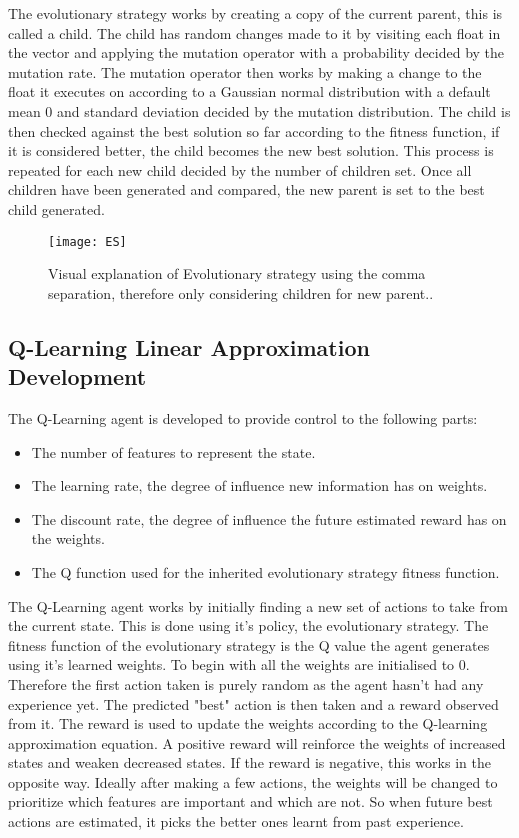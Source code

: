 \documentclass{report}
\begin{document}
The evolutionary strategy works by creating a copy of the current parent, this is called a child. The child has random changes made to it by visiting
each float in the vector and applying the mutation operator with a probability decided by the mutation rate. The mutation operator then works by making a change to the float
it executes on according to a Gaussian normal distribution \citep{gauss1809theoria} with a default mean 0 and standard deviation decided by the mutation distribution.
The child is then checked against the best solution so far according to the fitness function, if it is considered better, the child becomes the new best solution. This process is repeated
for each new child decided by the number of children set. Once all children have been generated and compared, the new parent is set to the best child generated.

\begin{figure}
\centerline{\texttt{[image: ES]}}
\caption[Evolutionary Strategy]{}
\centerline{Visual explanation of Evolutionary strategy using the comma separation, therefore only considering children for new parent..}
\end{figure}

\subsection{Q-Learning Linear Approximation Development}

The Q-Learning agent is developed to provide control to the following parts:
\begin{itemize}
	\item The number of features to represent the state.
	\item The learning rate, the degree of influence new information has on weights.
	\item The discount rate, the degree of influence the future estimated reward has on the weights.
	\item The Q function used for the inherited evolutionary strategy fitness function.
\end{itemize}

The Q-Learning agent works by initially finding a new set of actions to take from the current state. This is done using it's policy, the evolutionary strategy. The fitness function of
the evolutionary strategy is the Q value the agent generates using it's learned weights. To begin with all the weights are initialised to 0. Therefore the first action taken is purely
random as the agent hasn't had any experience yet. The predicted "best" action is then taken and a reward observed from it. The reward is used to update the weights according
to the Q-learning approximation equation. A positive reward will reinforce the weights of increased states and weaken decreased states. If the reward is negative, this works in the opposite 
way. Ideally after making a few actions, the weights will be changed to prioritize which features are important and which are not. So when future best actions are estimated, it picks the better ones
learnt from past experience.
\end{document}
